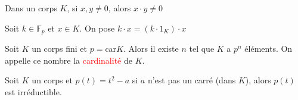        \begin{lemme}
            Dans un corps $K$, si $x, y \neq 0$, alors $x\cdot y \neq 0$
        \end{lemme}
    \begin{definition}
        Soit $k \in \mathbb{F}_p$ et $x \in K$. On pose $k \cdot x = (k\cdot 1_K)\cdot x$
    \end{definition}
    \begin{theoreme}
        Soit $K$ un corps fini et $p = $car$K$. Alors il existe $n$ tel que $K$ a $p^n$ éléments. On appelle ce nombre la \textcolor{red}{cardinalité} de $K$. 
    \end{theoreme}
        \begin{proposition}
            Soit $K$ un corps et $p(t) = t^2 - a$ si $a$ n'est pas un carré (dans $K$), alors $p(t)$ est irréductible.
        \end{proposition}